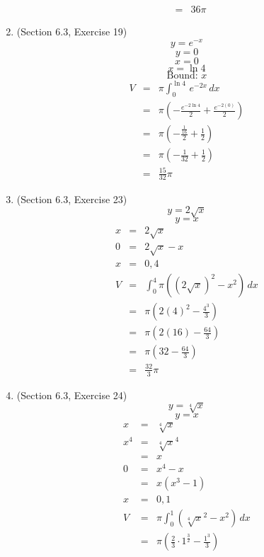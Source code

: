 \documentclass{article}
\begin{document}
\begin{enumerate}
\begin{eqnarray}
              &=& 36\pi
        \end{eqnarray}
    \item (Section 6.3, Exercise 19)
        $$y = e^{-x}$$
        $$y = 0$$
        $$x = 0$$
        $$x = \ln{4}$$
        $$\text{Bound: } x$$
        \begin{eqnarray}
            V &=& \pi\int_0^{\ln{4}}{\,e^{-2x}\,dx} \\
              &=& \pi\left(-\frac{e^{-2\ln{4}}}{2} + \frac{e^{-2(0)}}{2}\right) \\
              &=& \pi\left(-\frac{\frac{1}{16}}{2} + \frac{1}{2}\right) \\
              &=& \pi\left(-\frac{1}{32} + \frac{1}{2}\right) \\
              &=& \frac{15}{32}\pi
        \end{eqnarray}
    \item (Section 6.3, Exercise 23)
        $$y = 2\sqrt{x}$$
        $$y = x$$
        \begin{eqnarray}
            x &=& 2\sqrt{x} \\
            0 &=& 2\sqrt{x} - x \\
            x &=& 0, 4 \\
            V &=& \int_0^4{\pi\left(\left(2\sqrt{x}\right)^2 - x^2\right)\,dx} \\
              &=& \pi\left(2(4)^2 - \frac{4^3}{3}\right) \\
              &=& \pi\left(2(16) - \frac{64}{3}\right) \\
              &=& \pi\left(32 - \frac{64}{3}\right) \\
              &=& \frac{32}{3}\pi
        \end{eqnarray}
    \item (Section 6.3, Exercise 24)
        $$y = \sqrt[4]{x}$$
        $$y = x$$
        \begin{eqnarray}
            x &=& \sqrt[4]{x} \\
            x^4 &=& \sqrt[4]{x}^4 \\
                &=& x \\
            0 &=& x^4 - x \\
              &=& x\left(x^3 - 1\right) \\
            x &=& 0, 1 \\
            V &=& \pi\int_0^1{\left(\sqrt[4]{x}^2 - x^2\right)\,dx} \\
              &=& \pi\left(\frac{2}{3}\cdot1^{\frac{3}{2}} - \frac{1^3}{3}\right) \\

\end{eqnarray}
\end{enumerate}
\end{document}
